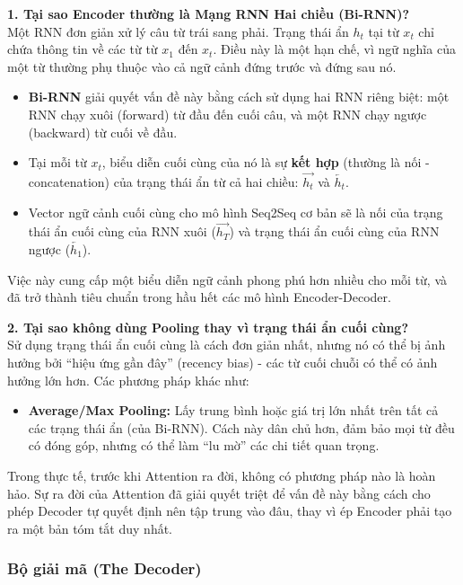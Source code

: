 \begin{tcolorbox}[
    title=Ghi chú sâu về Thiết kế của Encoder,
    colback=green!5!white, colframe=green!50!black, fonttitle=\bfseries
]
\textbf{1. Tại sao Encoder thường là Mạng RNN Hai chiều (Bi-RNN)?} \\
Một RNN đơn giản xử lý câu từ trái sang phải. Trạng thái ẩn $h_t$ tại từ $x_t$ chỉ chứa thông tin về các từ từ $x_1$ đến $x_t$. Điều này là một hạn chế, vì ngữ nghĩa của một từ thường phụ thuộc vào cả ngữ cảnh đứng trước và đứng sau nó.
\begin{itemize}
    \item \textbf{Bi-RNN} giải quyết vấn đề này bằng cách sử dụng hai RNN riêng biệt: một RNN chạy xuôi (forward) từ đầu đến cuối câu, và một RNN chạy ngược (backward) từ cuối về đầu.
    \item Tại mỗi từ $x_t$, biểu diễn cuối cùng của nó là sự \textbf{kết hợp} (thường là nối - concatenation) của trạng thái ẩn từ cả hai chiều: $\overrightarrow{h_t}$ và $\overleftarrow{h_t}$.
    \item Vector ngữ cảnh cuối cùng cho mô hình Seq2Seq cơ bản sẽ là nối của trạng thái ẩn cuối cùng của RNN xuôi ($\overrightarrow{h_T}$) và trạng thái ẩn cuối cùng của RNN ngược ($\overleftarrow{h_1}$).
\end{itemize}
Việc này cung cấp một biểu diễn ngữ cảnh phong phú hơn nhiều cho mỗi từ, và đã trở thành tiêu chuẩn trong hầu hết các mô hình Encoder-Decoder.

\textbf{2. Tại sao không dùng Pooling thay vì trạng thái ẩn cuối cùng?} \\
Sử dụng trạng thái ẩn cuối cùng là cách đơn giản nhất, nhưng nó có thể bị ảnh hưởng bởi “hiệu ứng gần đây” (recency bias) - các từ cuối chuỗi có thể có ảnh hưởng lớn hơn. Các phương pháp khác như:
\begin{itemize}
    \item \textbf{Average/Max Pooling:} Lấy trung bình hoặc giá trị lớn nhất trên tất cả các trạng thái ẩn (của Bi-RNN). Cách này dân chủ hơn, đảm bảo mọi từ đều có đóng góp, nhưng có thể làm “lu mờ” các chi tiết quan trọng.
\end{itemize}
Trong thực tế, trước khi Attention ra đời, không có phương pháp nào là hoàn hảo. Sự ra đời của Attention đã giải quyết triệt để vấn đề này bằng cách cho phép Decoder tự quyết định nên tập trung vào đâu, thay vì ép Encoder phải tạo ra một bản tóm tắt duy nhất.
\end{tcolorbox}
\subsubsection{Bộ giải mã (The Decoder)}
